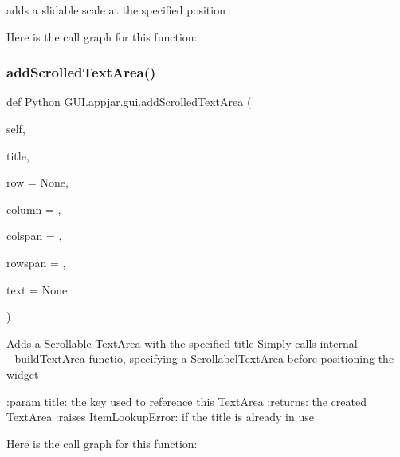 \begin{DoxyVerb}adds a slidable scale at the specified position \end{DoxyVerb}
 Here is the call graph for this function\+:
\mbox{\label{class_python_01_g_u_i_1_1appjar_1_1gui_aeed9dcabd10845ff85b0fe079672b015}} 
\subsubsection{\texorpdfstring{add\+Scrolled\+Text\+Area()}{addScrolledTextArea()}}
{\footnotesize\ttfamily def Python G\+U\+I.\+appjar.\+gui.\+add\+Scrolled\+Text\+Area (\begin{DoxyParamCaption}\item[{}]{self,  }\item[{}]{title,  }\item[{}]{row = {\ttfamily None},  }\item[{}]{column = {},  }\item[{}]{colspan = {},  }\item[{}]{rowspan = {},  }\item[{}]{text = {\ttfamily None} }\end{DoxyParamCaption})}

\begin{DoxyVerb}Adds a Scrollable TextArea with the specified title
Simply calls internal _buildTextArea functio, specifying a ScrollabelTextArea before positioning the widget

:param title: the key used to reference this TextArea
:returns: the created TextArea
:raises ItemLookupError: if the title is already in use
\end{DoxyVerb}
 Here is the call graph for this function\+:
\mbox{\label{class_python_01_g_u_i_1_1appjar_1_1gui_a193ccdc1472134023a3dfd9fb9dcbdc9}} 
